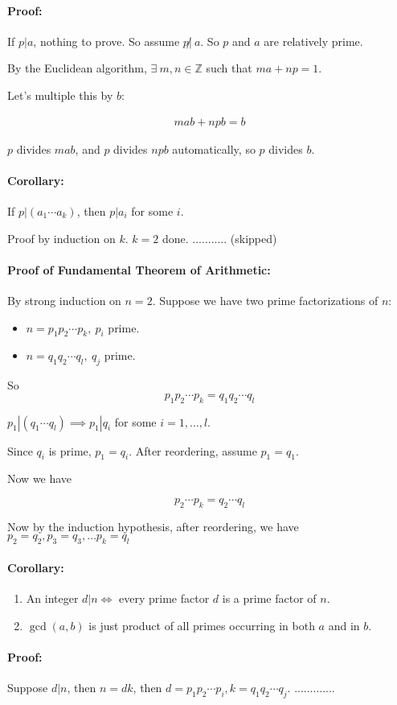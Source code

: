 \documentclass[a4paper, 11pt, twoside]{article}
\begin{document}
\paragraph{Proof:} If $p|a$, nothing to prove. So assume $p\not|\ a.$ So $p$ and $a$ are relatively prime.

By the Euclidean algorithm, $\exists\ m,n\in\mathbb{Z}$ such that $ma+np=1$.

Let's multiple this by $b$:

\[
\begin{split}
	mab+npb=b
\end{split}
\]

$p$ divides $mab$, and $p$ divides $npb$ automatically, so $p$ divides $b$.\\

\paragraph{Corollary:} If $p|(a_1\cdots a_k)$, then $p|a_i$ for some $i$.

Proof by induction on $k$. $k=2$ done. ........... (skipped)

\paragraph{Proof of Fundamental Theorem of Arithmetic:} By strong induction on $n=2$. Suppose we have two prime factorizations of $n$:

\begin{itemize}
	\item $n=p_1p_2\cdots p_k,\ p_i$ prime.
	\item $n=q_1q_2\cdots q_l,\ q_j$ prime.
\end{itemize}

So \[p_1p_2\cdots p_k=q_1q_2\cdots q_l\]

$p_1|(q_1\cdots q_l)\implies p_1|q_i$ for some $i=1,\dots, l$.

Since $q_i$ is prime, $p_1=q_i$. After reordering, assume $p_1=q_1$.

Now we have 

\[p_2\cdots p_k=q_2\cdots q_l\]

Now by the induction hypothesis, after reordering, we have $p_2=q_2, p_3=q_3,\dots p_k=q_l$\\

\paragraph{Corollary:}

\begin{enumerate}
	\item An integer $d|n \iff $ every prime factor $d$ is a prime factor of $n$.
	\item $\gcd(a,b)$ is just product of all primes occurring in both $a$ and in $b$.
\end{enumerate}

\paragraph{Proof:}

Suppose $d|n$, then $n=dk$, then $d=p_1p_2\cdots p_i, k=q_1q_2\cdots q_j.$ .............
\end{document}
